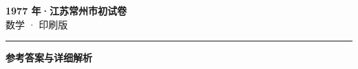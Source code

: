\documentclass[zihao=5, a4paper]{ctexart}
\begin{document}
\begin{center}
  {\Large\bfseries 1977 年·江苏常州市初试卷}\\[4pt]
  {\large 数学 · 印刷版}
\end{center}
\medskip
{}

\par\bigskip\hrule\bigskip
{}
\begin{center}{\large\bfseries 参考答案与详细解析}\end{center}
\smallskip

\end{document}
